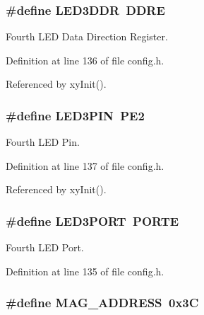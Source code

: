 \hypertarget{group__config_ga09535652dd0ca340b20840c848cb6093}{
\subsubsection[{L\-E\-D3\-D\-D\-R}]{\setlength{\rightskip}{0pt plus 5cm}\#define L\-E\-D3\-D\-D\-R~D\-D\-R\-E}}\label{group__config_ga09535652dd0ca340b20840c848cb6093}


Fourth L\-E\-D Data Direction Register. 



Definition at line 136 of file config.\-h.



Referenced by xy\-Init().

\hypertarget{group__config_ga2663b8fc01c4753562adc572cf12a5ed}{
\subsubsection[{L\-E\-D3\-P\-I\-N}]{\setlength{\rightskip}{0pt plus 5cm}\#define L\-E\-D3\-P\-I\-N~P\-E2}}\label{group__config_ga2663b8fc01c4753562adc572cf12a5ed}


Fourth L\-E\-D Pin. 



Definition at line 137 of file config.\-h.



Referenced by xy\-Init().

\hypertarget{group__config_ga63df95c1a0ce0e770964ca35e4032fb6}{
\subsubsection[{L\-E\-D3\-P\-O\-R\-T}]{\setlength{\rightskip}{0pt plus 5cm}\#define L\-E\-D3\-P\-O\-R\-T~P\-O\-R\-T\-E}}\label{group__config_ga63df95c1a0ce0e770964ca35e4032fb6}


Fourth L\-E\-D Port. 



Definition at line 135 of file config.\-h.

\hypertarget{group__config_gade4e63fac819c67040e374f08d2d7230}{
\subsubsection[{M\-A\-G\-\_\-\-A\-D\-D\-R\-E\-S\-S}]{\setlength{\rightskip}{0pt plus 5cm}\#define M\-A\-G\-\_\-\-A\-D\-D\-R\-E\-S\-S~0x3\-C}}\label{group__config_gade4e63fac819c67040e374f08d2d7230}


